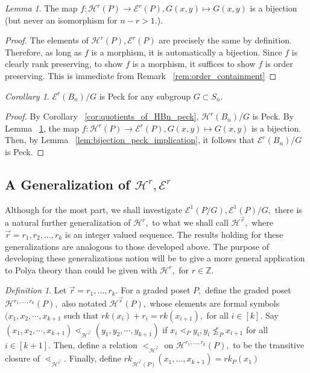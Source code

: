\documentclass[10 pt]{amsart}
\theoremstyle{plain}
\theoremstyle{definition}
\theoremstyle{remark}
\numberwithin{equation}{section}
\newtheorem{cor}[thm]{Corollary}
\newtheorem{lem}[thm]{Lemma}
\theoremstyle{remark}
\newtheorem{defn}[thm]{Definition}
\newcommand\BBZ{{\mathbb Z}}
\renewcommand{\vec}[1]{\overrightarrow{#1}}
\begin{document}
\begin{lem}
\label{bijection_h_f}
The map $f:\mathcal H^r(P) \rightarrow \mathcal E^r(P),G(x, y) \mapsto G(x, y)$ is a bijection (but never an isomorphism for $n-r > 1$.).
\end{lem}
\begin{proof}
The elements of $\mathcal H^r(P),\mathcal E^r(P)$ are precisely the same by definition. Therefore, as long as $f$ is a morphism, it is automatically a bijection. Since $f$ is clearly rank preserving, to show $f$ is a morphism, it suffices to show $f$ is order preserving. This is immediate from Remark ~\ref{rem:order_containment}
\end{proof}

\begin{cor}
\label{cor:quotiented_edge_peck}
$\mathcal E^r(B_n)/G$ is Peck for any subgroup $G\subset S_n$.
\end{cor}
\begin{proof}
By Corollary ~\ref{cor:quotients_of_HBn_peck}, $\mathcal H^r(B_n)/G$ is Peck. By Lemma ~\ref{bijection_h_f}, the map $f:\mathcal H^r(P) \rightarrow \mathcal E^r(P),G(x, y) \mapsto G(x, y)$ is a bijection. Then, by Lemma ~\ref{lem:bijection_peck_implication}, it follows that $\mathcal E^r(B_n)/G$ is Peck.
\end{proof}

\subsection{A Generalization of $\mathcal H^r,\mathcal E^r$}
Although for the most part, we shall investigate $\mathcal E^1(P/G),\mathcal E^1(P)/G,$ there is a natural further generalization of $\mathcal H^r,$ to what we shall call $\mathcal H^{\vec r},$ where $\vec r = r_1,r_2,\ldots, r_k$ is an integer valued sequence. The results holding for these generalizations are analogous to those developed above. The purpose of developing these generalizations notion will be to give a more general application to Polya theory than could be given with $\mathcal H^r,$ for $r \in \BBZ$.

\begin{defn}
Let $\vec r = r_1,\ldots,r_k.$ For a graded poset $P,$ define the graded poset $\mathcal H^{r_1,\ldots, r_k}(P),$ also notated $\mathcal H^{\vec r}(P),$ whose elements are formal symbols $(x_1, x_2, \cdots, x_{k+1}$ such that $rk(x_i)+r_i = rk(x_{i+1}),$ for all $i \in [k].$ Say $(x_1, x_2, \cdots, x_{k+1})\lessdot_{\mathcal H^{\vec r}} (y_1, y_2, \cdots, y_{k+1})$ if $x_i \lessdot_P y_i,y_{i} \not \leq_P x_{i+1}$ for all $i \in [k+1].$ Then, define a relation $<_{\mathcal H^{\vec r}}$ on $\mathcal H^{r_1,\ldots, r_k}(P),$ to be the transitive closure of $\lessdot_{\mathcal H^{\vec r}}.$ Finally, define $rk_{\mathcal H^{\vec r}(P)}(x_1,\ldots, x_{k+1}) = rk_P(x_1)$
\end{defn}
\end{document}
